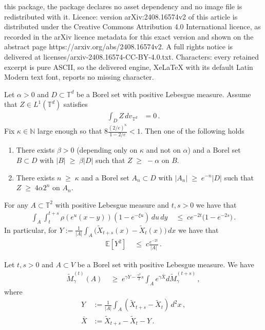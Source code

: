 \documentclass[10pt,a4paper]{amsart}
\def\T{\mathbb{T}}
\newcommand{\E}{\mathbb{E}}
\newcommand{\N}{\mathbb{N}}
\newcommand{\ab}{|}
\newcommand{\grea}{>}
\newcommand{\less}{<}
\renewcommand{\geq}{\;\geqslant\;}                   %
\renewcommand{\leq}{\;\leqslant\;}                   %
\renewcommand{\tilde}{\widetilde}          %
\begin{document}
this package, the package declares no asset dependency and no image file is redistributed with it. Licence: version arXiv:2408.16574v2 of this article is distributed under the Creative Commons Attribution 4.0 International licence, as recorded in the arXiv licence metadata for this exact version and shown on the abstract page https://arxiv.org/abs/2408.16574v2. A full rights notice is delivered at licenses/arxiv-2408.16574-CC-BY-4.0.txt. Characters: every retained excerpt is pure ASCII, so the delivered engine, XeLaTeX with its default Latin Modern text font, reports no missing character.
\begin{lemma}\label{ck}
Let $\alpha \grea 0$ and $D \subset \T^d$ be a Borel set with positive Lebesgue measure. Assume that $Z \in L^1(\T^d)$ satisfies 
\begin{align*}
\int_D Z \, dv_{\T^d} &= 0\,.
\end{align*}
Fix $\kappa \in \N$ large enough so that $ 8 \frac{ (2/e)^\kappa}{1-2/e} \less 1$.
Then one of the following holds
\begin{enumerate}
\item There exists $\beta \grea 0$ (depending only on $\kappa$ and not on $\alpha$) and a Borel set $B \subset D$ with $\ab B \ab \geq \beta \ab D \ab$ such that $Z \geq -\alpha$ on $B$.
\item There exists $n \geq \kappa$ and a Borel set $A_n \subset D$ with $\ab A_n \ab \geq e^{-n} \ab D \ab$ such that $Z \geq 4 \alpha 2^n $ on $A_n$.
\end{enumerate}
\end{lemma}

\begin{lemma}\label{y_lemma}
For any $A \subset \T^2$ with positive Lebesgue measure and $t,s \grea 0$ we have that 
\begin{align*}
\int_{A} \int_t^{t+s} \rho(e^u (x-y))(1-e^{-\xi u}) \, du \,  dy  &\leq c  e^{-2t} \big( 1 - e^{-2s} \big) \,.
\end{align*}
In particular, for $Y := \frac{1}{|A|} \int_A \big( \tilde X_{t+s}(x) - \tilde X_t(x) \big) \, dx$ we have that 
\begin{align*}
\E[Y^2] & \leq c \frac{e^{-2t}}{|A|}\,.
\end{align*}
\end{lemma}

\begin{lemma}\label{XY}
Let $t,s > 0$ and $A \subset V$ be a Borel set with positive Lebesgue measure. We have
\begin{align*}
\tilde M^{(t)}_\gamma(A) &\geq  e^{\gamma Y - \frac{\gamma^2}{2}s} \int_A e^{\gamma \bar X} d\tilde M^{(t+s)}_\gamma\,,
\end{align*}
where
\begin{align*}
Y &:= \frac{1}{|A|} \int_A (\tilde X_{t+s} - \tilde X_t) \, d^2x\,, \\
\bar X &:= \tilde X_{t+s} - \tilde X_t - Y\,.
\end{align*}
\end{lemma}
\end{document}
